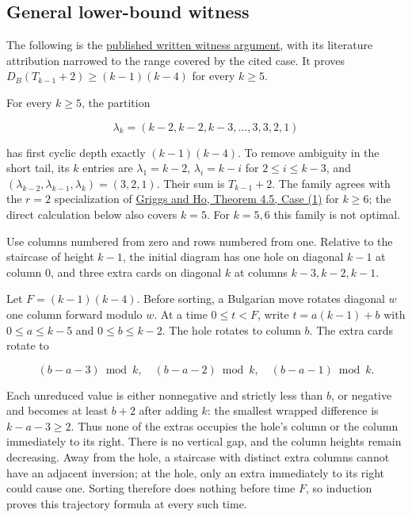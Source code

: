 \documentclass[11pt,a4paper]{article}
\begin{document}
\subsection{General lower-bound witness}\label{general-lower-bound-witness}

The following is the \href{https://github.com/mpelteshki/climbing-to-the-frontier/blob/212bba53b1818c08c40b8c4b48f636651eaf6410/cagent/p3/c5/lower-bound-proof.md}{published written witness argument}, with its literature attribution narrowed to the range covered by the cited case. It proves \(D_B(T_{k-1}+2)\ge(k-1)(k-4)\) for every \(k\ge5\).

For every \(k\ge5\), the partition

\[
\lambda_k=(k-2,k-2,k-3,\ldots,3,3,2,1)
\]

has first cyclic depth exactly \((k-1)(k-4)\). To remove ambiguity in the short tail, its \(k\) entries are \(\lambda_1=k-2\), \(\lambda_i=k-i\) for \(2\le i\le k-3\), and \((\lambda_{k-2},\lambda_{k-1},\lambda_k)=(3,2,1)\). Their sum is \(T_{k-1}+2\). The family agrees with the \(r=2\) specialization of \href{https://sc.edu/study/colleges_schools/artsandsciences/mathematics/research/imi/research/documents/1998/1998_12.pdf}{Griggs and Ho, Theorem 4.5, Case (1)} for \(k\ge6\); the direct calculation below also covers \(k=5\). For \(k=5,6\) this family is not optimal.

Use columns numbered from zero and rows numbered from one. Relative to the staircase of height \(k-1\), the initial diagram has one hole on diagonal \(k-1\) at column \(0\), and three extra cards on diagonal \(k\) at columns \(k-3,k-2,k-1\).

Let \(F=(k-1)(k-4)\). Before sorting, a Bulgarian move rotates diagonal \(w\) one column forward modulo \(w\). At a time \(0\le t<F\), write \(t=a(k-1)+b\) with \(0\le a\le k-5\) and \(0\le b\le k-2\). The hole rotates to column \(b\). The extra cards rotate to

\[
(b-a-3)\bmod k,\quad(b-a-2)\bmod k,\quad(b-a-1)\bmod k.
\]

Each unreduced value is either nonnegative and strictly less than \(b\), or negative and becomes at least \(b+2\) after adding \(k\): the smallest wrapped difference is \(k-a-3\ge2\). Thus none of the extras occupies the hole's column or the column immediately to its right. There is no vertical gap, and the column heights remain decreasing. Away from the hole, a staircase with distinct extra columns cannot have an adjacent inversion; at the hole, only an extra immediately to its right could cause one. Sorting therefore does nothing before time \(F\), so induction proves this trajectory formula at every such time.
\end{document}
